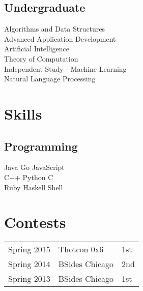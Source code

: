 \documentclass[letterpaper]{deedy-resume} %
\begin{document}
\begin{minipage}[t]{0.33\textwidth}
\subsection{Undergraduate}

Algorithms and Data Structures \\
Advanced Application Development \\
Artificial Intelligence \\
Theory of Computation \\
Independent Study - Machine Learning \\
Natural Language Processing \\

\sectionspace %


\section{Skills}

\subsection{Programming}

Java \textbullet{} Go \textbullet{} JavaScript  \\
 C++ \textbullet{} Python \textbullet{} C \ \\ 
\sectionspace %
Ruby \textbullet{} Haskell \textbullet{} Shell  \\

\sectionspace %



\section{Contests} 

\begin{tabular}{rll}
Spring 2015 & Thotcon 0x6 & 1st\\
Spring 2014 & BSides Chicago & 2nd\\
Spring 2013 & BSides Chicago & 1st\\
\end{tabular}

\sectionspace %


\end{minipage} %
\end{document}
